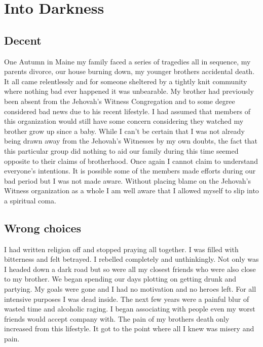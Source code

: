 \documentclass[11pt,a4paper]{scrartcl} %
\begin{document}
\section{Into Darkness}
\begin{doublespace}
\subsection{Decent}
One Autumn in Maine my family faced a series of tragedies all in sequence, my parents divorce, our house burning down, my younger brothers accidental death. It all came relentlessly and for someone sheltered by a tightly knit community where nothing bad ever happened it was unbearable. My brother had previously been absent from the Jehovah's Witness Congregation and to some degree considered bad news due to his recent lifestyle. I had assumed that members of this organization would still have some concern considering they watched my brother grow up since a baby. While I can't be certain that I was not already being drawn away from the Jehovah's Witnesses by my own doubts, the fact that this particular group did nothing to aid our family during this time seemed opposite to their claims of brotherhood. Once again I cannot claim to understand everyone's intentions. It is possible some of the members made efforts during our bad period but I was not made aware. Without placing blame on the Jehovah's Witness organization as a whole I am well aware that I allowed myself to slip into a spiritual coma. 
\subsection{Wrong choices}
I had written religion off and stopped praying all together. I was filled with bitterness and felt betrayed. I rebelled completely and unthinkingly. Not only was I headed down a dark road but so were all my closest friends who were also close to my brother. We began spending our days plotting on getting drunk and partying. My goals were gone and I had no motivation and no heroes left. For all intensive purposes I was dead inside. The next few years were a painful blur of wasted time and alcoholic raging. I began associating with people even my worst friends would accept company with. The pain of my brothers death only increased from this lifestyle. It got to the point where all I knew was misery and pain. 
\end{doublespace}
\begin{center}
\textcolor{Maroon}{}\\
\textcolor{brown}{}\\
\end{center}
\end{document}
